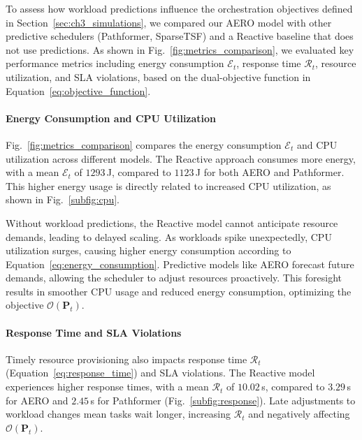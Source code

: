 To assess how workload predictions influence the orchestration objectives defined in Section~\ref{sec:ch3_simulations}, we compared our \ac{AERO} model with other predictive schedulers (Pathformer, \ac{SparseTSF}) and a Reactive baseline that does not use predictions. As shown in Fig.~\ref{fig:metrics_comparison}, we evaluated key performance metrics including energy consumption $\mathcal{E}_t$, response time $\mathcal{R}_t$, resource utilization, and \ac{SLA} violations, based on the dual-objective function in Equation~\eqref{eq:objective_function}.

\paragraph*{Energy Consumption and \ac{CPU} Utilization}

Fig.~\ref{fig:metrics_comparison} compares the energy consumption $\mathcal{E}_t$ and \ac{CPU} utilization across different models. The Reactive approach consumes more energy, with a mean $\mathcal{E}_t$ of $1293$\,J, compared to $1123$\,J for both \ac{AERO} and Pathformer. This higher energy usage is directly related to increased \ac{CPU} utilization, as shown in Fig.~\ref{subfig:cpu}.

Without workload predictions, the Reactive model cannot anticipate resource demands, leading to delayed scaling. As workloads spike unexpectedly, \ac{CPU} utilization surges, causing higher energy consumption according to Equation~\eqref{eq:energy_consumption}. Predictive models like \ac{AERO} forecast future demands, allowing the scheduler to adjust resources proactively. This foresight results in smoother \ac{CPU} usage and reduced energy consumption, optimizing the objective $\mathcal{O}(\mathbf{P}_t)$.

\paragraph*{Response Time and \ac{SLA} Violations}

Timely resource provisioning also impacts response time $\mathcal{R}_t$ (Equation~\eqref{eq:response_time}) and \ac{SLA} violations. The Reactive model experiences higher response times, with a mean $\mathcal{R}_t$ of $10.02$\,s, compared to $3.29$\,s for \ac{AERO} and $2.45$\,s for Pathformer (Fig.~\ref{subfig:response}). Late adjustments to workload changes mean tasks wait longer, increasing $\mathcal{R}_t$ and negatively affecting $\mathcal{O}(\mathbf{P}_t)$.

